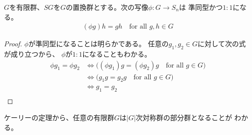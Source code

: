 	\begin{proposition}[ケーリーの定理]\label{prop:ケーリーの定理} %
		$G$を有限群、$SG$を$G$の置換群とする。次の写像$\phi:G\to S_n$は
		準同型かつ$1:1$になる。
		\begin{equation*}\begin{split} %
			(\phi g)h = gh \quad\text{for all }g,h\in G
		\end{split}\end{equation*} %
	\end{proposition} %
	\begin{proof} $\phi$が準同型になることは明らかである。
	任意の$g_1,g_2\in G$に対して次の式が成り立つから、
	$\phi$が$1:1$になることもわかる。
	\begin{equation*}\begin{split}
		\phi g_1 = \phi g_2 
		&\iff \bigl((\phi g_1)g = (\phi g_2)g
			\quad\text{for all }g\in G\bigr) \\
		&\iff \bigl(g_1g = g_2g \quad\text{for all }g\in G\bigr) \\
		&\iff g_1 = g_2 \\
	\end{split}\end{equation*}
	\end{proof}

	ケーリーの定理から、任意の有限群$G$は$|G|$次対称群の部分群となることが
	わかる。
\endgroup %
